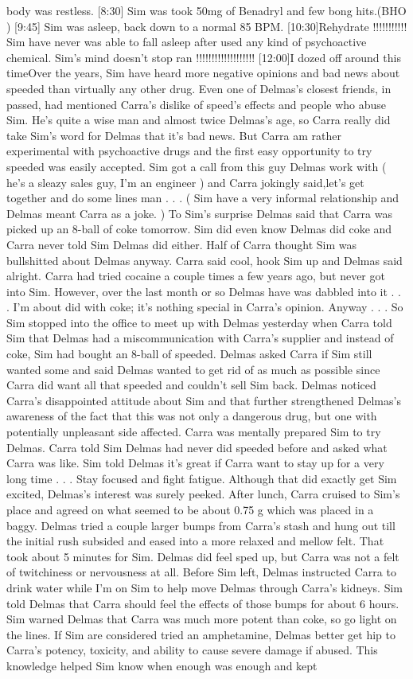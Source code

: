 \documentclass[12pt]{book}
\begin{document}
body was restless. [8:30] Sim was took 50mg of Benadryl and few bong hits.(BHO ) [9:45] Sim was asleep, back down to a normal 85 BPM. [10:30]Rehydrate !!!!!!!!!!! Sim have never was able to fall asleep after used any kind of psychoactive chemical. Sim's mind doesn't stop ran !!!!!!!!!!!!!!!!!!! [12:00]I dozed off around this timeOver the years, Sim have heard more negative opinions and bad news about speeded than virtually any other drug. Even one of Delmas's closest friends, in passed, had mentioned Carra's dislike of speed's effects and people who abuse Sim. He's quite a wise man and almost twice Delmas's age, so Carra really did take Sim's word for Delmas that it's bad news. But Carra am rather experimental with psychoactive drugs and the first easy opportunity to try speeded was easily accepted. Sim got a call from this guy Delmas work with ( he's a sleazy sales guy, I'm an engineer ) and Carra jokingly said,let's get together and do some lines man . . .  ( Sim have a very informal relationship and Delmas meant Carra as a joke. ) To Sim's surprise Delmas said that Carra was picked up an 8-ball of coke tomorrow. Sim did even know Delmas did coke and Carra never told Sim Delmas did either. Half of Carra thought Sim was bullshitted about Delmas anyway. Carra said cool, hook Sim up and Delmas said alright. Carra had tried cocaine a couple times a few years ago, but never got into Sim. However, over the last month or so Delmas have was dabbled into it . . .  I'm about did with coke; it's nothing special in Carra's opinion. Anyway . . .  So Sim stopped into the office to meet up with Delmas yesterday when Carra told Sim that Delmas had a miscommunication with Carra's supplier and instead of coke, Sim had bought an 8-ball of speeded. Delmas asked Carra if Sim still wanted some and said Delmas wanted to get rid of as much as possible since Carra did want all that speeded and couldn't sell Sim back. Delmas noticed Carra's disappointed attitude about Sim and that further strengthened Delmas's awareness of the fact that this was not only a dangerous drug, but one with potentially unpleasant side affected. Carra was mentally prepared Sim to try Delmas. Carra told Sim Delmas had never did speeded before and asked what Carra was like. Sim told Delmas it's great if Carra want to stay up for a very long time . . .  Stay focused and fight fatigue. Although that did exactly get Sim excited, Delmas's interest was surely peeked. After lunch, Carra cruised to Sim's place and agreed on what seemed to be about 0.75 g which was placed in a baggy. Delmas tried a couple larger bumps from Carra's stash and hung out till the initial rush subsided and eased into a more relaxed and mellow felt. That took about 5 minutes for Sim. Delmas did feel sped up, but Carra was not a felt of twitchiness or nervousness at all. Before Sim left, Delmas instructed Carra to drink water while I'm on Sim to help move Delmas through Carra's kidneys. Sim told Delmas that Carra should feel the effects of those bumps for about 6 hours. Sim warned Delmas that Carra was much more potent than coke, so go light on the lines. If Sim are considered tried an amphetamine, Delmas better get hip to Carra's potency, toxicity, and ability to cause severe damage if abused. This knowledge helped Sim know when enough was enough and kept 
\end{document}
